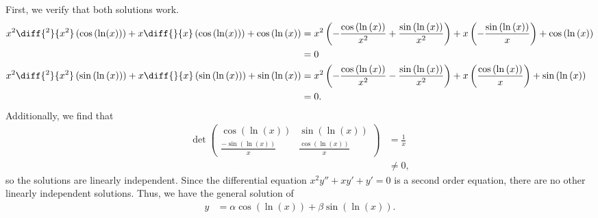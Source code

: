 \documentclass[10pt]{mypackage}
\begin{document}
\begin{solution}[Problem 28]
  First, we verify that both solutions work.
  {\footnotesize
    \begin{align*}
    x^2 \diff{^2}{x^2}\left(\cos\left(\ln(x)\right)\right) + x \diff{}{x}\left(\cos\left(\ln(x)\right)\right) + \cos\left(\ln\left(x\right)\right) &= x^2\left(-\frac{\cos\left(\ln\left(x\right)\right)}{x^2} + \frac{\sin\left(\ln\left(x\right)\right)}{x^2}\right) + x\left(-\frac{\sin\left(\ln\left(x\right)\right)}{x}\right) + \cos\left(\ln\left(x\right)\right)\\
                                                                                                                                                   &= 0\\
    x^2 \diff{^2}{x^2}\left(\sin\left(\ln\left(x\right)\right)\right) + x \diff{}{x}\left(\sin\left(\ln\left(x\right)\right)\right) + \sin\left(\ln\left(x\right)\right) &= x^2 \left(-\frac{\cos\left(\ln\left(x\right)\right)}{x^2} - \frac{\sin\left(\ln\left(x\right)\right)}{x^2}\right) + x\left(\frac{\cos\left(\ln\left(x\right)\right)}{x}\right) + \sin\left(\ln\left(x\right)\right)\\
                                                                                                                                                                         &= 0.
  \end{align*}
}
Additionally, we find that
\begin{align*}
  \det \begin{pmatrix}\cos\left(\ln\left(x\right)\right) & \sin\left(\ln\left(x\right)\right) \\ \frac{-\sin\left(\ln\left(x\right)\right)}{x} & \frac{\cos\left(\ln\left(x\right)\right)}{x}\end{pmatrix} &= \frac{1}{x}\\
                                                         &\neq 0,
\end{align*}
so the solutions are linearly independent. Since the differential equation $x^2y'' + xy' + y' = 0$ is a second order equation, there are no other linearly independent solutions. Thus, we have the general solution of
\begin{align*}
  y &= \alpha \cos\left(\ln\left(x\right)\right) + \beta \sin\left(\ln\left(x\right)\right).
\end{align*}
\end{solution}
\begin{solution}[Problem 30]

\end{solution}
\begin{solution}[Problem 36]

\end{solution}
\end{document}
